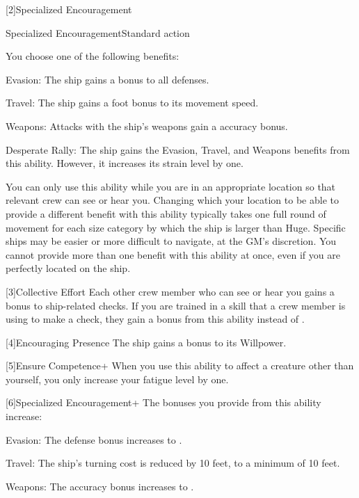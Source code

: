     [2]{Specialized Encouragement}
    \begin{activeability}{Specialized Encouragement}{Standard action}
        \rankline

        You choose one of the following benefits:
        \begin{raggeditemize}
          \item Evasion: The ship  gains a  bonus to all defenses.
          \item Travel: The ship  gains a  foot bonus to its movement speed.
          \item Weapons: Attacks with the ship's weapons  gain a  accuracy bonus.
          \item Desperate Rally: The ship  gains the Evasion, Travel, and Weapons benefits from this ability.
            However, it increases its strain level by one.
        \end{raggeditemize}

        You can only use this ability while you are in an appropriate location so that relevant crew can see or hear you.
        Changing which your location to be able to provide a different benefit with this ability typically takes one full round of movement for each size category by which the ship is larger than Huge.
        Specific ships may be easier or more difficult to navigate, at the GM's discretion.
        You cannot provide more than one benefit with this ability at once, even if you are perfectly located on the ship.
      \end{activeability}

    [3]{Collective Effort} Each other crew member who can see or hear you gains a  bonus to ship-related checks.
      If you are trained in a skill that a crew member is using to make a check, they gain a  bonus from this ability instead of .

    [4]{Encouraging Presence} The ship gains a  bonus to its Willpower.

    [5]{Ensure Competence+} When you use this ability to affect a creature other than yourself, you only increase your fatigue level by one.

    [6]{Specialized Encouragement+} The bonuses you provide from this ability increase:
      \begin{raggeditemize}
        \item Evasion: The defense bonus increases to .
        \item Travel: The ship's turning cost is reduced by 10 feet, to a minimum of 10 feet.
        \item Weapons: The accuracy bonus increases to .
      \end{raggeditemize}

